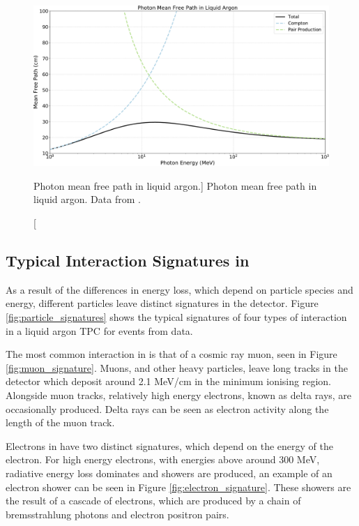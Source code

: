 \begin{figure}

	\centering

	\includegraphics[width=\textwidth]{figures/photon_mfp.pdf}

	\caption
	[Photon mean free path in liquid argon.]
	{Photon mean free path in liquid argon. Data from \cite{photon_xsec}.}

	\label{fig:photon_mfp}

\end{figure}

\subsection{Typical Interaction Signatures in \protodune{}}
As a result of the differences in energy loss, which depend on particle species
and energy, different particles leave distinct signatures in the detector.  
Figure \ref{fig:particle_signatures} shows the typical signatures of four 
types of interaction in a liquid argon TPC for events from \protodune{} 
data.

The most common interaction in \protodune{} is that of a cosmic ray muon, seen
in Figure \ref{fig:muon_signature}. Muons, and other heavy particles, leave 
long tracks in the detector which deposit around 2.1 MeV/cm in the minimum 
ionising region. Alongside muon tracks, relatively high energy electrons, 
known as delta rays, are occasionally produced. Delta rays can be seen as 
electron activity along the length of the muon track.

Electrons in \protodune{} have two distinct signatures, which depend on the
energy of the electron. For high energy electrons, with energies above around
300 MeV, radiative energy loss dominates and showers are produced, an example 
of an electron shower can be seen in Figure \ref{fig:electron_signature}. 
These showers are the result of a cascade of electrons, which are produced by 
a chain of bremsstrahlung photons and electron positron pairs.

